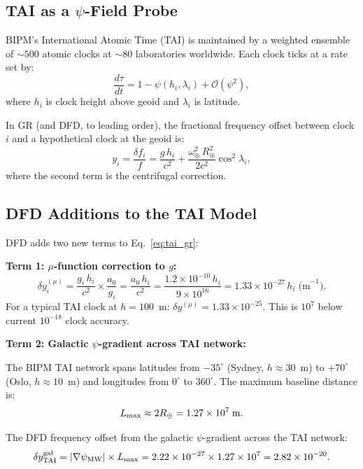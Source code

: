 \documentclass[aps,prd,twocolumn,superscriptaddress,nofootinbib]{revtex4-2}
\newcommand{\order}[1]{\mathcal{O}(#1)}
\begin{document}
\subsection{TAI as a $\psi$-Field Probe}

BIPM's International Atomic Time (TAI) is maintained by a weighted ensemble
of $\sim 500$ atomic clocks at $\sim 80$ laboratories worldwide. Each clock
ticks at a rate set by:
\begin{equation}
\frac{d\tau}{dt} = 1 - \psi(h_i, \lambda_i) + \order{\psi^2},
\end{equation}
where $h_i$ is clock height above geoid and $\lambda_i$ is latitude.

In GR (and DFD, to leading order), the fractional frequency offset between
clock $i$ and a hypothetical clock at the geoid is:
\begin{equation}
y_i = \frac{\delta f_i}{f} = \frac{g\,h_i}{c^2}
  + \frac{\omega_\oplus^2\,R_\oplus^2}{2c^2}\cos^2\!\lambda_i,
\label{eq:tai_gr}
\end{equation}
where the second term is the centrifugal correction.

\subsection{DFD Additions to the TAI Model}

DFD adds two new terms to Eq.~\eqref{eq:tai_gr}:

\textbf{Term 1: $\mu$-function correction to $g$:}
\begin{equation}
\delta y_i^{(\mu)} = \frac{g_i\,h_i}{c^2}\times\frac{a_0}{g_i}
= \frac{a_0\,h_i}{c^2} = \frac{1.2\times10^{-10}\,h_i}{9\times10^{16}}
= 1.33\times10^{-27}\,h_i\;\text{(m}^{-1}\text{)}.
\label{eq:mu_correction}
\end{equation}
For a typical TAI clock at $h = 100$~m: $\delta y^{(\mu)} = 1.33\times10^{-25}$.
This is $10^7$ below current $10^{-18}$ clock accuracy.

\textbf{Term 2: Galactic $\psi$-gradient across TAI network:}

The BIPM TAI network spans latitudes from $-35^\circ$ (Sydney, $h \approx 30$~m)
to $+70^\circ$ (Oslo, $h \approx 10$~m) and longitudes from $0^\circ$ to $360^\circ$.
The maximum baseline distance is:
\begin{equation}
L_{\rm max} \approx 2R_\oplus = 1.27\times10^7\;\text{m}.
\end{equation}

The DFD frequency offset from the galactic $\psi$-gradient across the
TAI network:
\begin{equation}
\delta y^{\rm gal}_{\rm TAI} = |\nabla\psi_{\rm MW}|\times L_{\rm max}
= 2.22\times10^{-27}\times1.27\times10^7
= 2.82\times10^{-20}.
\label{eq:tai_gal}
\end{equation}
\end{document}
